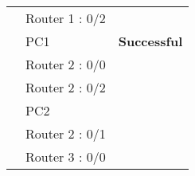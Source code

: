 \documentclass[a4paper,11pt]{article}
\begin{document}
\begin{enumerate}
\begin{table}[H]
\begin{tabular}{| m{9em}| m{12em}| m{9em} |}
                  \hhline{>{\arrayrulecolor{black}}|>{\arrayrulecolor[rgb]{0.333,0.686,1}}->{\arrayrulecolor{black}}->{\arrayrulecolor[rgb]{0.376,1,0.882}}-}
                  {\cellcolor[rgb]{0.333,0.686,1}}                                & Router 1 : 0/2       & {\cellcolor[rgb]{0.376,1,0.882}}                                                      \\
                  \hhline{>{\arrayrulecolor{black}}|>{\arrayrulecolor[rgb]{0.333,0.686,1}}->{\arrayrulecolor{black}}->{\arrayrulecolor[rgb]{0.376,1,0.882}}-}
                  {\cellcolor[rgb]{0.333,0.686,1}}                                & PC1                  & \multirow{-4}{*}{{\cellcolor[rgb]{0.376,1,0.882}}\textbf{Successful}}                 \\
                  \hhline{>{\arrayrulecolor{black}}|>{\arrayrulecolor[rgb]{0.333,0.686,1}}->{\arrayrulecolor{black}}->{\arrayrulecolor[rgb]{1,0.173,0.09}}-}
                  {\cellcolor[rgb]{0.333,0.686,1}}                                & Router 2 : 0/0       & {\cellcolor[rgb]{1,0.173,0.09}}                                                       \\
                  \hhline{>{\arrayrulecolor{black}}|>{\arrayrulecolor[rgb]{0.333,0.686,1}}->{\arrayrulecolor{black}}->{\arrayrulecolor[rgb]{1,0.173,0.09}}-}
                  {\cellcolor[rgb]{0.333,0.686,1}}                                & Router 2 : 0/2       & {\cellcolor[rgb]{1,0.173,0.09}}                                                       \\
                  \hhline{>{\arrayrulecolor{black}}|>{\arrayrulecolor[rgb]{0.333,0.686,1}}->{\arrayrulecolor{black}}->{\arrayrulecolor[rgb]{1,0.173,0.09}}-}
                  {\cellcolor[rgb]{0.333,0.686,1}}                                & PC2                  & {\cellcolor[rgb]{1,0.173,0.09}}                                                       \\
                  \hhline{>{\arrayrulecolor{black}}|>{\arrayrulecolor[rgb]{0.333,0.686,1}}->{\arrayrulecolor{black}}->{\arrayrulecolor[rgb]{1,0.173,0.09}}-}
                  {\cellcolor[rgb]{0.333,0.686,1}}                                & Router 2 : 0/1       & {\cellcolor[rgb]{1,0.173,0.09}}                                                       \\
                  \hhline{>{\arrayrulecolor{black}}|>{\arrayrulecolor[rgb]{0.333,0.686,1}}->{\arrayrulecolor{black}}->{\arrayrulecolor[rgb]{1,0.173,0.09}}-}
                  {\cellcolor[rgb]{0.333,0.686,1}}                                & Router 3 : 0/0       & {\cellcolor[rgb]{1,0.173,0.09}}                                                       \\

\end{tabular}
\end{table}
\end{enumerate}
\end{document}
